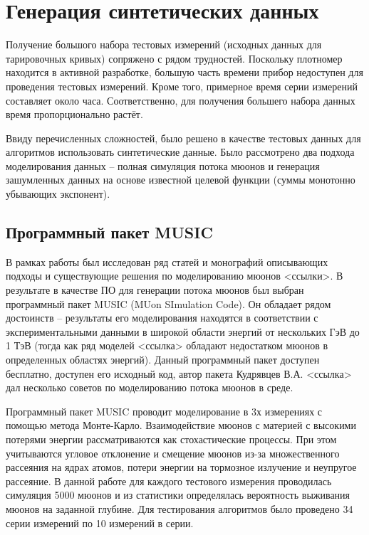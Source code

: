 \section{Генерация синтетических данных}\label{sect2_3}


Получение большого набора тестовых измерений (исходных данных 
для тарировочных кривых) сопряжено с рядом трудностей. Поскольку 
плотномер находится в активной разработке,
большую часть времени прибор недоступен для проведения тестовых
измерений. Кроме того, примерное время серии измерений составляет
около часа. Соответственно, 
для получения большего набора данных время пропорционально растёт.


Ввиду перечисленных сложностей, было решено в качестве тестовых
данных для алгоритмов использовать синтетические данные. Было 
рассмотрено два подхода моделирования данных -- 
полная симуляция потока мюонов и генерация зашумленных данных 
на основе известной целевой функции (суммы монотонно убывающих экспонент).


\subsection{Программный пакет MUSIC}\label{subsect2_3_1}


В рамках работы был исследован ряд статей и монографий описывающих подходы и существующие
решения по моделированию мюонов <ссылки>. В результате в качестве ПО для 
генерации потока мюонов
был выбран программный пакет MUSIC (MUon SImulation Code). Он обладает
рядом достоинств -- 
результаты его моделирования находятся в соответствии с экспериментальными
данными в широкой области энергий от нескольких ГэВ до 1 ТэВ (тогда как ряд
моделей <ссылка> обладают
недостатком мюонов в определенных областях энергий). Данный программный 
пакет доступен бесплатно, доступен его исходный код, автор пакета
Кудрявцев В.А. <ссылка> дал несколько 
советов по моделированию потока мюонов в среде.


Программный пакет MUSIC проводит моделирование в 3х измерениях с помощью 
метода Монте-Карло. Взаимодействие мюонов с материей с высокими
потерями энергии рассматриваются 
как стохастические процессы. При этом учитываются угловое отклонение 
и смещение мюонов из-за множественного рассеяния на ядрах атомов, 
потери энергии на тормозное излучение
и неупругое рассеяние. В данной работе для каждого тестового измерения 
проводилась симуляция 5000 мюонов и из статистики определялась вероятность
выживания мюонов на заданной глубине. 
Для тестирования алгоритмов было проведено 34 серии измерений по 10 измерений в серии. 


